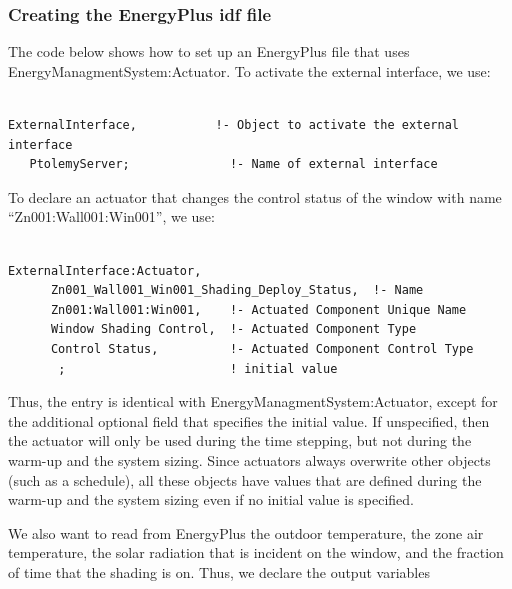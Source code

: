 \subsubsection{Creating the EnergyPlus idf file}\label{creating-the-energyplus-idf-file-1}

The code below shows how to set up an EnergyPlus file that uses EnergyManagmentSystem:Actuator. To activate the external interface, we use:

\begin{lstlisting}

ExternalInterface,           !- Object to activate the external interface
   PtolemyServer;              !- Name of external interface
\end{lstlisting}

To declare an actuator that changes the control status of the window with name ``Zn001:Wall001:Win001'', we use:

\begin{lstlisting}

ExternalInterface:Actuator,
      Zn001_Wall001_Win001_Shading_Deploy_Status,  !- Name
      Zn001:Wall001:Win001,    !- Actuated Component Unique Name
      Window Shading Control,  !- Actuated Component Type
      Control Status,          !- Actuated Component Control Type
       ;                       ! initial value
\end{lstlisting}

Thus, the entry is identical with EnergyManagmentSystem:Actuator, except for the additional optional field that specifies the initial value. If unspecified, then the actuator will only be used during the time stepping, but not during the warm-up and the system sizing. Since actuators always overwrite other objects (such as a schedule), all these objects have values that are defined during the warm-up and the system sizing even if no initial value is specified.

We also want to read from EnergyPlus the outdoor temperature, the zone air temperature, the solar radiation that is incident on the window, and the fraction of time that the shading is on. Thus, we declare the output variables

